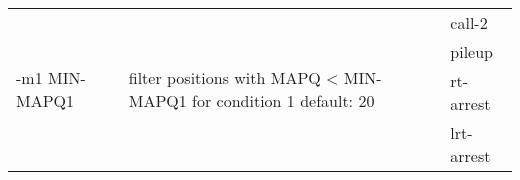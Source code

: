 {\small
\begin{tabular}{@{}p{}p{}l@{}}
\multirow{4}{=}{-m1 MIN-MAPQ1} & \multirow{4}{=}{filter positions with MAPQ < MIN-MAPQ1 for condition 1
default: 20} & call-2 \\
 &  & pileup \\
 &  & rt-arrest \\
 &  & lrt-arrest \\
\end{tabular}\\
}
